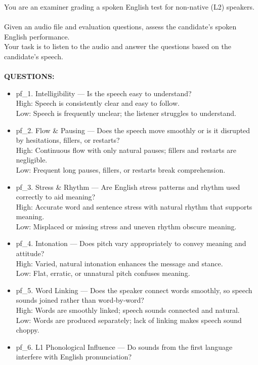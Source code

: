 \documentclass{report}
\begin{document}
\begin{tcolorbox}[breakable, colback=white, colframe=black, title=Revised Question Set Batch Prompt]
You are an examiner grading a spoken English test for non-native (L2) speakers.
\\\\
Given an audio file and evaluation questions, assess the candidate’s spoken English performance.
\\Your task is to listen to the audio and answer the questions based on the candidate's speech.
\\\\
\textbf{QUESTIONS:}
\begin{itemize}
  \item pf\_1. Intelligibility — Is the speech easy to understand?\\
    High: Speech is consistently clear and easy to follow.\\
    Low: Speech is frequently unclear; the listener struggles to understand.
  \item pf\_2. Flow \& Pausing — Does the speech move smoothly or is it disrupted by hesitations, fillers, or restarts?\\
    High: Continuous flow with only natural pauses; fillers and restarts are negligible.\\
    Low: Frequent long pauses, fillers, or restarts break comprehension.
  \item pf\_3. Stress \& Rhythm — Are English stress patterns and rhythm used correctly to aid meaning?\\
    High: Accurate word and sentence stress with natural rhythm that supports meaning.\\
    Low: Misplaced or missing stress and uneven rhythm obscure meaning.
  \item pf\_4. Intonation — Does pitch vary appropriately to convey meaning and attitude?\\
    High: Varied, natural intonation enhances the message and stance.\\
    Low: Flat, erratic, or unnatural pitch confuses meaning.
  \item pf\_5. Word Linking — Does the speaker connect words smoothly, so speech sounds joined rather than word‑by‑word?\\
    High: Words are smoothly linked; speech sounds connected and natural.\\
    Low: Words are produced separately; lack of linking makes speech sound choppy.
  \item pf\_6. L1 Phonological Influence — Do sounds from the first language interfere with English pronunciation?\\

\end{itemize}
\end{tcolorbox}
\end{document}
